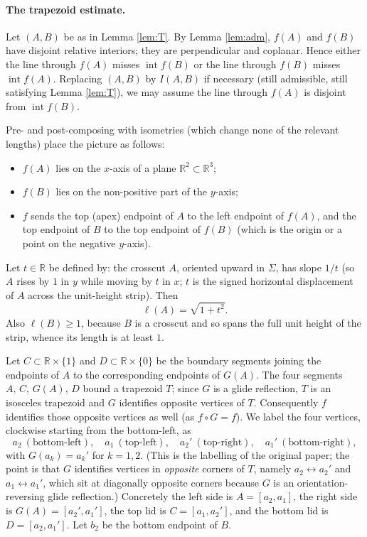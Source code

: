\documentclass[12pt]{article}
\newcommand{\R}{\mathbb{R}}
\newcommand{\Sig}{\Sigma}
\DeclareMathOperator{\interior}{int}
\begin{document}
\paragraph{The trapezoid estimate.}
Let $(A,B)$ be as in Lemma \ref{lem:T}. By Lemma \ref{lem:adm}, $f(A)$
and $f(B)$ have disjoint relative interiors; they are perpendicular and
coplanar. Hence either the line through $f(A)$ misses $\interior f(B)$ or
the line through $f(B)$ misses $\interior f(A)$. Replacing $(A,B)$ by
$I(A,B)$ if necessary (still admissible, still satisfying Lemma
\ref{lem:T}), we may assume the line through $f(A)$ is disjoint from
$\interior f(B)$.

Pre- and post-composing with isometries (which change none of the
relevant lengths) place the picture as follows:
\begin{itemize}
\item $f(A)$ lies on the $x$-axis of a plane $\R^2\subset\R^3$;
\item $f(B)$ lies on the non-positive part of the $y$-axis;
\item $f$ sends the top (apex) endpoint of $A$ to the left endpoint of
$f(A)$, and the top endpoint of $B$ to the top endpoint of $f(B)$ (which
is the origin or a point on the negative $y$-axis).
\end{itemize}
Let $t\in\R$ be defined by: the crosscut $A$, oriented upward in $\Sig$,
has slope $1/t$ (so $A$ rises by $1$ in $y$ while moving by $t$ in $x$;
$t$ is the signed horizontal displacement of $A$ across the unit-height
strip). Then
\[
\ell(A)=\sqrt{1+t^2}.
\]
Also $\ell(B)\ge1$, because $B$ is a crosscut and so spans the full unit
height of the strip, whence its length is at least $1$.

Let $C\subset\R\times\{1\}$ and $D\subset\R\times\{0\}$ be the boundary
segments joining the endpoints of $A$ to the corresponding endpoints of
$G(A)$. The four segments $A,\,C,\,G(A),\,D$ bound a trapezoid $T$; since
$G$ is a glide reflection, $T$ is an isosceles trapezoid and $G$
identifies opposite vertices of $T$. Consequently $f$ identifies those
opposite vertices as well (as $f\circ G=f$). We label the four vertices,
clockwise starting from the bottom-left, as
\[
a_2\ (\text{bottom-left}),\quad a_1\ (\text{top-left}),\quad
a_2'\ (\text{top-right}),\quad a_1'\ (\text{bottom-right}),
\]
with $G(a_k)=a_k'$ for $k=1,2$. (This is the labelling of the original
paper; the point is that $G$ identifies vertices in \emph{opposite}
corners of $T$, namely $a_2\!\leftrightarrow\!a_2'$ and
$a_1\!\leftrightarrow\!a_1'$, which sit at diagonally opposite corners
because $G$ is an orientation-reversing glide reflection.) Concretely the
left side is $A=[a_2,a_1]$, the right side is $G(A)=[a_2',a_1']$, the top
lid is $C=[a_1,a_2']$, and the bottom lid is $D=[a_2,a_1']$. Let $b_2$ be
the bottom endpoint of $B$.
\end{document}
